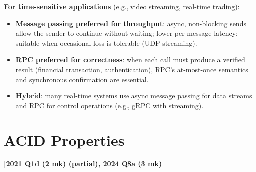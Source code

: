 \documentclass[11pt,a4paper]{article}
\newcommand{\qref}[1]{\textbf{\textcolor{examblue}{[#1]}}}
\newcommand{\mk}[1]{\textcolor{slidegray}{\small(#1 mk)}}
\begin{document}
\begin{answerbox}
\textbf{For time-sensitive applications} (e.g., video streaming, real-time trading):
\begin{itemize}
  \item \textbf{Message passing preferred for throughput}: async, non-blocking sends allow the sender to continue without waiting; lower per-message latency; suitable when occasional loss is tolerable (UDP streaming).
  \item \textbf{RPC preferred for correctness}: when each call must produce a verified result (financial transaction, authentication), RPC's at-most-once semantics and synchronous confirmation are essential.
  \item \textbf{Hybrid}: many real-time systems use async message passing for data streams and RPC for control operations (e.g., gRPC with streaming).
\end{itemize}
\end{answerbox}

\section{ACID Properties}
\qref{2021 Q1d \mk{2} (partial), 2024 Q8a \mk{3}}
\end{document}
